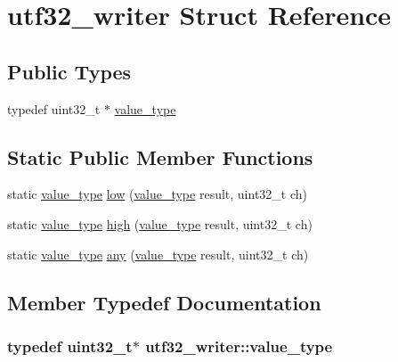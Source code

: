 \hypertarget{structutf32__writer}{
\section{utf32\_\-writer Struct Reference}
\label{structutf32__writer}
}
\subsection*{Public Types}
\begin{DoxyCompactItemize}
\item 
typedef uint32\_\-t $\ast$ \hyperlink{structutf32__writer_a2284e1fa3406f113f151ded2aaa8d4ae}{value\_\-type}
\end{DoxyCompactItemize}
\subsection*{Static Public Member Functions}
\begin{DoxyCompactItemize}
\item 
static \hyperlink{structutf32__writer_a2284e1fa3406f113f151ded2aaa8d4ae}{value\_\-type} \hyperlink{structutf32__writer_a06e1b65906f7355ea54a622248095bc7}{low} (\hyperlink{structutf32__writer_a2284e1fa3406f113f151ded2aaa8d4ae}{value\_\-type} result, uint32\_\-t ch)
\item 
static \hyperlink{structutf32__writer_a2284e1fa3406f113f151ded2aaa8d4ae}{value\_\-type} \hyperlink{structutf32__writer_a3f86d996cde3ed7cab5c31930b67c9f1}{high} (\hyperlink{structutf32__writer_a2284e1fa3406f113f151ded2aaa8d4ae}{value\_\-type} result, uint32\_\-t ch)
\item 
static \hyperlink{structutf32__writer_a2284e1fa3406f113f151ded2aaa8d4ae}{value\_\-type} \hyperlink{structutf32__writer_aa94aaa4a13e755942e7da70ea7700d3e}{any} (\hyperlink{structutf32__writer_a2284e1fa3406f113f151ded2aaa8d4ae}{value\_\-type} result, uint32\_\-t ch)
\end{DoxyCompactItemize}


\subsection{Member Typedef Documentation}
\hypertarget{structutf32__writer_a2284e1fa3406f113f151ded2aaa8d4ae}{
\subsubsection[{value\_\-type}]{\setlength{\rightskip}{0pt plus 5cm}typedef uint32\_\-t$\ast$ {\bf utf32\_\-writer::value\_\-type}}}
\label{structutf32__writer_a2284e1fa3406f113f151ded2aaa8d4ae}


